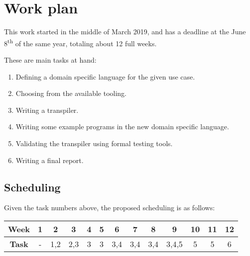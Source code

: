 \documentclass[runningheads]{../llncs}
\begin{document}
\section{Work plan}
This work started in the middle of March 2019, and has a deadline at the June 8\textsuperscript{th} of the same year, totaling about 12 full weeks.
\par These are main tasks at hand:
\begin{enumerate}
	\item Defining a domain specific language for the given use case.
	\item Choosing from the available tooling.
	\item Writing a transpiler.
	\item Writing some example programs in the new domain specific language.
	\item Validating the transpiler using formal testing tools.
	\item Writing a final report.
\end{enumerate}
\subsection{Scheduling}
Given the task numbers above, the proposed scheduling is as follows:
\begin{table}
\centering
\begin{tabular}{c|c|c|c|c|c|c|c|c|c|c|c|c}
\hline
\textbf{Week} & 1 & 2   & 3   & 4 & 5 & 6   & 7   & 8   & 9     & 10 & 11 & 12 \\ \hline
\textbf{Task} & - & 1,2 & 2,3 & 3 & 3 & 3,4 & 3,4 & 3,4 & 3,4,5 & 5  & 5  & 6  \\ \hline
\end{tabular}
\end{table}



\end{document}
